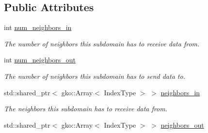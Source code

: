 \subsection*{Public Attributes}
\begin{DoxyCompactItemize}
\item 
\mbox{\label{structSchwarzWrappers_1_1Communicate_1_1comm__struct_a76ea8ef104d4c81e07be4208d91fe20d}} 
int \hyperlink{structSchwarzWrappers_1_1Communicate_1_1comm__struct_a76ea8ef104d4c81e07be4208d91fe20d}{num\+\_\+neighbors\+\_\+in}
\begin{DoxyCompactList}\small\item\em The number of neighbors this subdomain has to receive data from. \end{DoxyCompactList}\item 
\mbox{\label{structSchwarzWrappers_1_1Communicate_1_1comm__struct_a50f2b918dc0f724f1fbb06fa06785fc9}} 
int \hyperlink{structSchwarzWrappers_1_1Communicate_1_1comm__struct_a50f2b918dc0f724f1fbb06fa06785fc9}{num\+\_\+neighbors\+\_\+out}
\begin{DoxyCompactList}\small\item\em The number of neighbors this subdomain has to send data to. \end{DoxyCompactList}\item 
\mbox{\label{structSchwarzWrappers_1_1Communicate_1_1comm__struct_ae3506066f4c927b09d4d996d24b25310}} 
std\+::shared\+\_\+ptr$<$ gko\+::\+Array$<$ Index\+Type $>$ $>$ \hyperlink{structSchwarzWrappers_1_1Communicate_1_1comm__struct_ae3506066f4c927b09d4d996d24b25310}{neighbors\+\_\+in}
\begin{DoxyCompactList}\small\item\em The neighbors this subdomain has to receive data from. \end{DoxyCompactList}\item 
\mbox{\label{structSchwarzWrappers_1_1Communicate_1_1comm__struct_a6d90365238da0ade020d1fe010414784}} 
std\+::shared\+\_\+ptr$<$ gko\+::\+Array$<$ Index\+Type $>$ $>$ \hyperlink{structSchwarzWrappers_1_1Communicate_1_1comm__struct_a6d90365238da0ade020d1fe010414784}{neighbors\+\_\+out}

\end{DoxyCompactItemize}
